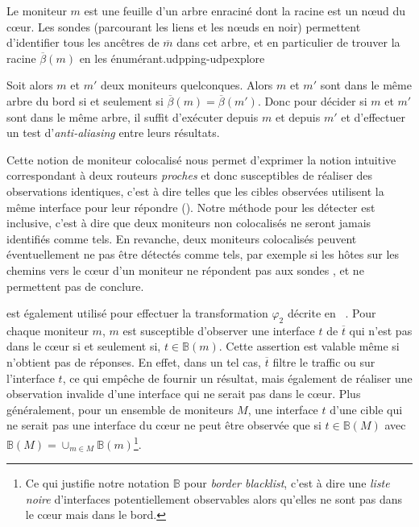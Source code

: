  {Le moniteur $m$ est une feuille d'un arbre enraciné dont la racine
est un n\oe{}ud du c\oe{}ur. Les sondes \udpexplore (parcourant les liens et les
n\oe{}uds en noir) permettent d'identifier tous les ancêtres de $\overline{m}$ dans
cet arbre, et en particulier de trouver la racine $\overline{\beta}(m)$ en
les énumérant.}{udpping-udpexplore}

Soit alors $m$ et $m'$ deux moniteurs quelconques. Alors $m$ et $m'$ sont dans
le même arbre du bord si et seulement si $\overline{\beta}(m) =
\overline{\beta}(m')$. Donc pour décider si $m$ et $m'$ sont dans le même arbre,
il suffit d'exécuter \udpexplore depuis $m$ et depuis $m'$ et d'effectuer un
test d'{\em anti-aliasing} entre leurs résultats.


Cette notion de moniteur colocalisé nous permet d'exprimer la notion intuitive
correspondant à deux routeurs {\em proches} et donc susceptibles de réaliser des
observations identiques, c'est à dire telles que les cibles observées utilisent
la même interface pour leur répondre (). Notre
méthode pour les détecter est inclusive, c'est à dire que deux moniteurs non
colocalisés ne seront jamais identifiés comme tels. En revanche, deux moniteurs
colocalisés peuvent éventuellement ne pas être détectés comme tels, par exemple
si les hôtes sur les chemins vers le c\oe{}ur d'un moniteur ne répondent pas aux
sondes \udpping, et ne permettent pas de conclure.

\udpexplore est également utilisé pour effectuer la transformation $\varphi_2$
décrite en ~. Pour chaque moniteur
$m$, $m$ est susceptible d'observer une interface $t$ de $\overline{t}$ qui
n'est pas dans le c\oe{}ur si et seulement si, $t \in {\mathbb B}(m)$. Cette
assertion est valable même si \udpexplore n'obtient pas de réponses. En effet,
dans un tel cas, $\overline{t}$ filtre le traffic \icmp ou \udp sur
l'interface $t$, ce qui empêche \udpexplore de fournir un résultat, mais
également \udpping de réaliser une observation invalide d'une
interface qui ne serait pas dans le c\oe{}ur. Plus généralement, pour un ensemble
de moniteurs $M$, une interface $t$ d'une cible qui ne serait pas une interface
du c\oe{}ur ne peut être observée que si $t \in {\mathbb B}(M)$ avec ${\mathbb
B}(M) = \cup_{m \in M} {\mathbb B}(m)$\footnote{Ce qui justifie notre notation
${\mathbb B}$ pour {\em border blacklist}, c'est à dire une {\em liste noire}
d'interfaces potentiellement observables alors qu'elles ne sont pas dans le
c\oe{}ur mais dans le bord.}.

